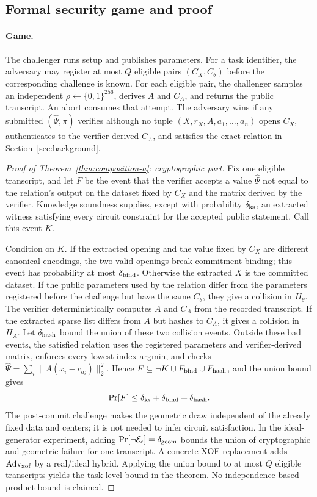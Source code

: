 \documentclass[pdflatex,sn-mathphys-num,iicol]{sn-jnl}
\theoremstyle{plain}
\theoremstyle{definition}
\theoremstyle{remark}
\begin{document}
\begin{appendices}
\section{Formal security game and proof}\label{app:security-a}
\paragraph{Game.} The challenger runs setup and publishes parameters. For a task identifier, the adversary may register at most $Q$ eligible pairs $(C_X,C_\theta)$ before the corresponding challenge is known. For each eligible pair, the challenger samples an independent $\rho\leftarrow\{0,1\}^{256}$, derives $A$ and $C_A$, and returns the public transcript. An abort consumes that attempt. The adversary wins if any submitted $(\widehat\Psi,\pi)$ verifies although no tuple $(X,r_X,A,a_1,\ldots,a_n)$ opens $C_X$, authenticates to the verifier-derived $C_A$, and satisfies the exact relation in Section~\ref{sec:background}.

\begin{proof}[Proof of Theorem~\ref{thm:composition-a}: cryptographic part]
Fix one eligible transcript, and let $F$ be the event that the verifier accepts a value $\widehat\Psi$ not equal to the relation's output on the dataset fixed by $C_X$ and the matrix derived by the verifier. Knowledge soundness supplies, except with probability $\delta_{\rm ks}$, an extracted witness satisfying every circuit constraint for the accepted public statement. Call this event $K$.

Condition on $K$. If the extracted opening and the value fixed by $C_X$ are different canonical encodings, the two valid openings break commitment binding; this event has probability at most $\delta_{\rm bind}$. Otherwise the extracted $X$ is the committed dataset. If the public parameters used by the relation differ from the parameters registered before the challenge but have the same $C_\theta$, they give a collision in $H_\theta$. The verifier deterministically computes $A$ and $C_A$ from the recorded transcript. If the extracted sparse list differs from $A$ but hashes to $C_A$, it gives a collision in $H_A$. Let $\delta_{\rm hash}$ bound the union of these two collision events. Outside these bad events, the satisfied relation uses the registered parameters and verifier-derived matrix, enforces every lowest-index argmin, and checks
$\widehat\Psi=\sum_i\|A(x_i-c_{a_i})\|_2^2$.
Hence $F\subseteq\neg K\cup F_{\rm bind}\cup F_{\rm hash}$, and the union bound gives
\[
\Pr[F]\le\delta_{\rm ks}+\delta_{\rm bind}+\delta_{\rm hash}.
\]
The post-commit challenge makes the geometric draw independent of the already fixed data and centers; it is not needed to infer circuit satisfaction. In the ideal-generator experiment, adding $\Pr[\neg\mathcal E_\epsilon]=\delta_{\rm geom}$ bounds the union of cryptographic and geometric failure for one transcript. A concrete XOF replacement adds $\operatorname{Adv}_{\rm xof}$ by a real/ideal hybrid. Applying the union bound to at most $Q$ eligible transcripts yields the task-level bound in the theorem. No independence-based product bound is claimed.
\end{proof}


\end{appendices}
\end{document}
